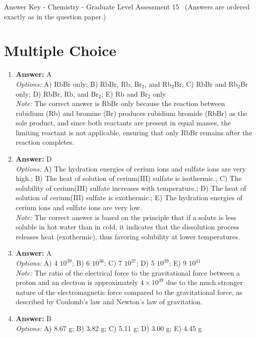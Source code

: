 \documentclass[12pt]{article}
\begin{document}
\begin{center}
Answer Key - Chemistry - Graduate Level Assessment 15 \
\small (Answers are ordered exactly as in the question paper.)
\end{center}

\section*{Multiple Choice}
\begin{enumerate}[label=\arabic*.]
\item \textbf{Answer:} A
\\ \textit{Options:} A) RbBr only; B) RbBr, Rb, Br$_{2}$, and Rb$_{2}$Br; C) RbBr and Rb$_{2}$Br only; D) RbBr, Rb, and Br$_{2}$; E) Rb and Br$_{2}$ only
\\ \textit{Note:} The correct answer is RbBr only because the reaction between rubidium (Rb) and bromine (Br) produces rubidium bromide (RbBr) as the sole product, and since both reactants are present in equal masses, the limiting reactant is not applicable, ensuring that only RbBr remains after the reaction completes.
\item \textbf{Answer:} D
\\ \textit{Options:} A) The hydration energies of cerium ions and sulfate ions are very high.; B) The heat of solution of cerium(III) sulfate is isothermic.; C) The solubility of cerium(III) sulfate increases with temperature.; D) The heat of solution of cerium(III) sulfate is exothermic.; E) The hydration energies of cerium ions and sulfate ions are very low.
\\ \textit{Note:} The correct answer is based on the principle that if a solute is less soluble in hot water than in cold, it indicates that the dissolution process releases heat (exothermic), thus favoring solubility at lower temperatures.
\item \textbf{Answer:} A
\\ \textit{Options:} A) 4 $10^{39}$; B) 6 $10^{36}$; C) 7 $10^{37}$; D) 5 $10^{39}$; E) 9 $10^{41}$
\\ \textit{Note:} The ratio of the electrical force to the gravitational force between a proton and an electron is approximately \( 4 \times 10^{39} \) due to the much stronger nature of the electromagnetic force compared to the gravitational force, as described by Coulomb's law and Newton's law of gravitation.
\item \textbf{Answer:} B
\\ \textit{Options:} A) 8.67 g; B) 3.82 g; C) 5.11 g; D) 3.00 g; E) 4.45 g

\end{enumerate}
\end{document}
